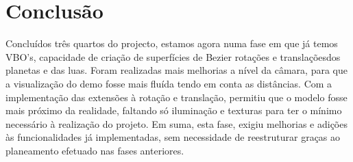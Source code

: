 \chapter{Conclusão}

Concluídos três quartos do projecto, estamos agora numa fase em que já temos VBO's, capacidade de criação de superfícies de Bezier rotações e translaçõesdos planetas e das luas.
Foram realizadas mais melhorias a nível da câmara, para que a visualização do demo fosse mais fluída tendo em conta as distâncias.
Com a implementação das extensões à rotação e translação, permitiu que o modelo fosse mais próximo da realidade, faltando só iluminação e texturas para ter o mínimo necessário à realização do projeto.
Em suma, esta fase, exigiu melhorias e adições às funcionalidades já implementadas, sem necessidade de reestruturar graças ao planeamento efetuado nas fases anteriores.

